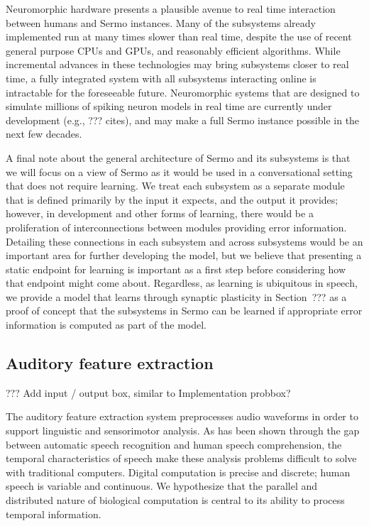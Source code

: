 Neuromorphic hardware
presents a plausible avenue
to real time interaction
between humans and Sermo instances.
Many of the subsystems already implemented
run at many times slower than real time,
despite the use of recent general purpose
CPUs and GPUs,
and reasonably efficient algorithms.
While incremental advances
in these technologies may
bring subsystems closer to real time,
a fully integrated system
with all subsystems interacting online
is intractable for the foreseeable future.
Neuromorphic systems that are designed
to simulate millions of spiking neuron models
in real time
are currently under development
(e.g., ??? cites),
and may make a full Sermo instance
possible in the next few decades.

A final note about
the general architecture of Sermo
and its subsystems
is that we will focus on a view
of Sermo as it would be used
in a conversational setting
that does not require learning.
We treat each subsystem as a separate
module that is defined primarily
by the input it expects,
and the output it provides;
however, in development and other forms
of learning,
there would be a proliferation of
interconnections between modules
providing error information.
Detailing these connections
in each subsystem and across subsystems
would be an important area
for further developing the model,
but we believe that presenting
a static endpoint for learning
is important as a first step
before considering
how that endpoint might come about.
Regardless,
as learning is ubiquitous in speech,
we provide a model that learns
through synaptic plasticity
in Section~??? as
a proof of concept that
the subsystems in Sermo
can be learned if appropriate
error information is computed
as part of the model.

\subsection{Auditory feature extraction}

??? Add input / output box, similar to Implementation probbox?

The auditory feature extraction system
preprocesses audio waveforms
in order to support
linguistic and sensorimotor analysis.
As has been shown through
the gap between
automatic speech recognition
and human speech comprehension,
the temporal characteristics
of speech
make these analysis problems
difficult to solve
with traditional computers.
Digital computation is precise and discrete;
human speech is variable and continuous.
We hypothesize that the
parallel and distributed nature
of biological computation
is central to its
ability to process temporal information.


